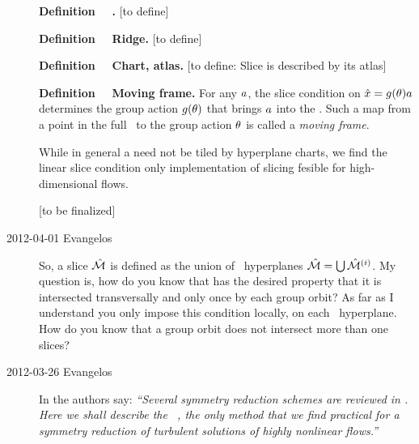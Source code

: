 \begin{description}
\textbf{Definition~~}
\textbf{\ChartBord.}
[to define]

\textbf{Definition~~}
\textbf{Ridge.}
[to define]

\textbf{Definition~~}
\textbf{Chart, atlas.}
[to define: Slice is described by its
atlas]

\textbf{Definition~~}
\label{def:movingFrame}
\textbf{Moving frame.}
For any $a$, the slice condition  on $\hat{x} =
g(\theta)a$ determines the group action $g(\theta)$ that
brings $ a$ into the \slice.
Such a map from a point in the full \statesp\ to the group action
$\theta$ is called a \emph{moving
frame}.

While in general a {\slice} need not be tiled by hyperplane charts,
we find the linear slice condition  only implementation
of slicing fesible for high-dimensional flows.

[to be finalized]

\item[2012-04-01 Evangelos] So, a slice $\hat{\cal M}$ is defined as the union of
\slice\ hyperplanes $\hat{\cal M}=\bigcup\hat{\cal M}{}^{(i)}$. My question is, how do you know
that \pSRed has the desired property that it is intersected transversally and only once
by each group orbit? As far as I understand you only impose this condition locally, on each
\slice\ hyperplane. How do you know that a group orbit does not intersect more than
one slices? 

\item[2012-03-26 Evangelos] In  the authors say:
\emph{``Several symmetry reduction schemes are reviewed in
. Here we shall describe the \mslices\
\citep{rowley_reconstruction_2000,BeTh04,FrCv11}, the only method that we
find practical for a symmetry reduction of turbulent solutions of highly
nonlinear flows.''}


\end{description}
